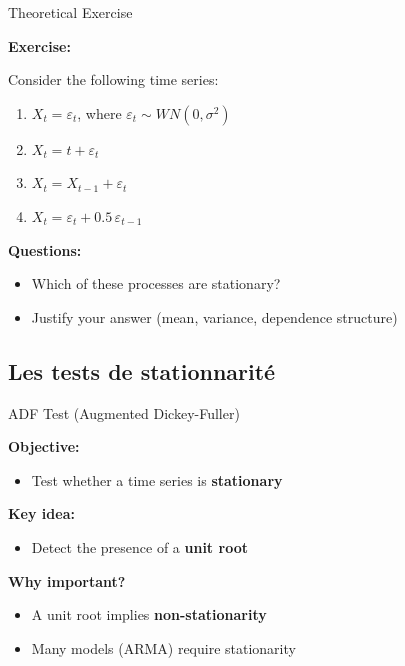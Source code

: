 \documentclass[aspectratio=169]{beamer}
\begin{document}
\begin{frame}{Theoretical Exercise}

\textbf{Exercise:}

Consider the following time series:

\begin{enumerate}
    \item $X_t = \varepsilon_t$, where $\varepsilon_t \sim WN(0,\sigma^2)$
    \item $X_t = t + \varepsilon_t$
    \item $X_t = X_{t-1} + \varepsilon_t$
    \item $X_t = \varepsilon_t + 0.5\,\varepsilon_{t-1}$
\end{enumerate}

\vspace{0.4cm}

\textbf{Questions:}
\begin{itemize}
    \item Which of these processes are stationary?
    \item Justify your answer (mean, variance, dependence structure)
\end{itemize}

\vspace{0.4cm}
\end{frame}



\subsection{Les tests de stationnarité}

\begin{frame}{ADF Test (Augmented Dickey-Fuller)}

\textbf{Objective:}
\begin{itemize}
    \item Test whether a time series is \textbf{stationary}
\end{itemize}

\vspace{0.4cm}

\textbf{Key idea:}
\begin{itemize}
    \item Detect the presence of a \textbf{unit root}
\end{itemize}

\vspace{0.4cm}

\textbf{Why important?}
\begin{itemize}
    \item A unit root implies \textbf{non-stationarity}
    \item Many models (ARMA) require stationarity
\end{itemize}
\end{frame}
\end{document}
